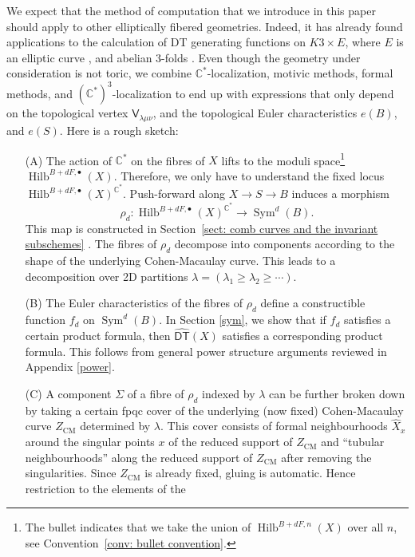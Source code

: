\documentclass{amsart}
\theoremstyle{definition}
\newcommand{\CC} {\mathbb{C}}          %
\newcommand{\sfV}{\mathsf{V}}
\newcommand{\Sym}{\operatorname{Sym}}
\newcommand{\Hilb}{\operatorname{Hilb}}
\newcommand{\DT}{\mathsf{DT}}
\newcommand{\CM}{\operatorname{CM}}
\newcommand{\DThat}{\widehat{\DT}}
\newcommand{\Xhat}{\widehat{X}}
\begin{document}
We expect that the method of computation that we introduce in this
paper should apply to other elliptically fibered geometries. Indeed,
it has already found applications to the calculation of DT generating
functions on $K3 \times E$, where $E$ is an elliptic curve
\cite{Bryan-K3xE}, and abelian 3-folds \cite{BOPY}. Even though the
geometry under consideration is not toric, we combine
$\CC^*$-localization, motivic methods, formal methods, and
$(\CC^{*})^{3}$-localization to end up with expressions that only
depend on the topological vertex $\sfV_{\lambda\mu\nu}$, and the
topological Euler characteristics $e(B)$, and $e(S)$. Here is a rough
sketch:
\begin{enumerate}
\item[(A)] The action of $\CC^*$ on the fibres of $X$ lifts to the
moduli space\footnote{The bullet indicates that we take the union of
$\Hilb^{B+dF,n}(X)$ over all $n$, see Convention~\ref{conv: bullet
convention}.}  $\Hilb^{B+dF,\bullet}(X)$. Therefore, we only have to
understand the fixed locus
$\Hilb^{B+dF,\bullet}(X)^{\CC^*}$. Push-forward along $X \rightarrow S
\rightarrow B$ induces a morphism
\begin{equation*} 
\rho_{d}: \Hilb^{B+dF,\bullet}(X)^{\CC^*} \rightarrow \Sym^d(B).
\end{equation*}
This map is constructed in Section~\ref{sect: comb curves and the
invariant subschemes} . The fibres of $\rho_{d}$ decompose into
components according to the shape of the underlying Cohen-Macaulay
curve. This leads to a decomposition over 2D partitions $\lambda =
(\lambda_1 \geq \lambda_2 \geq \cdots)$.
\item[(B)] The Euler characteristics of the fibres of $\rho_{d}$
define a constructible function $f_d$ on $\Sym^d(B)$. In Section
\ref{sym}, we show that if $f_d$ satisfies a certain product formula,
then $\DThat (X)$ satisfies a corresponding product formula. This
follows from general power structure arguments reviewed in Appendix
\ref{power}.
\item[(C)] A component $\Sigma$ of a fibre of $\rho_{d}$ indexed
by $\lambda$ can be further broken down by taking a certain fpqc cover
of the underlying (now fixed) Cohen-Macaulay curve $Z_{\CM}$
determined by $\lambda$. This cover consists of formal neighbourhoods
$\Xhat _x$ around the singular points $x$ of the reduced support of
$Z_{\CM}$ and ``tubular neighbourhoods'' along the reduced support of
$Z_{\CM}$ after removing the singularities. Since $Z_{\CM}$ is already
fixed, gluing is automatic. Hence restriction to the elements of the

\end{enumerate}
\end{document}
